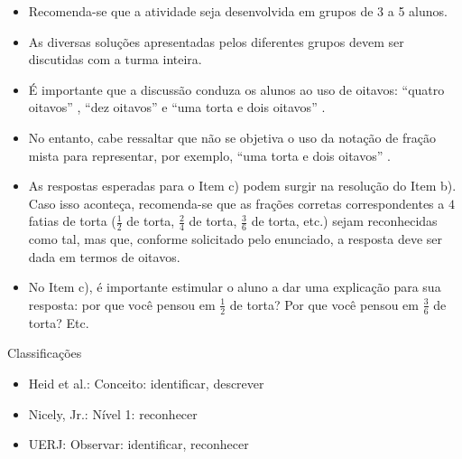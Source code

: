 \documentclass[oneside]{book}
\begin{document}
\begin{multicols}{2}
\begin{itemize} %
    \item       Recomenda-se que a atividade seja desenvolvida em grupos de 3 a 5 alunos.
    \item       As diversas soluções apresentadas pelos diferentes grupos devem ser discutidas com a turma inteira.
    \item       É importante que a discussão conduza os alunos ao uso de oitavos:       ``quatro oitavos''      ,       ``dez oitavos''       e       ``uma torta e dois oitavos''      .
    \item       No entanto, cabe ressaltar que não se objetiva o uso da notação de fração mista para representar, por exemplo,       ``uma torta e dois oitavos''      .
    \item       As respostas esperadas para o Item c) podem surgir na resolução do Item b). Caso isso aconteça, recomenda-se que as frações corretas correspondentes a       $4$       fatias de torta ($\frac{1}{2}$       de torta,       $\frac{2}{4}$       de torta,       $\frac{3}{6}$       de torta, etc.) sejam reconhecidas como tal, mas que, conforme solicitado pelo enunciado, a resposta deve ser dada em termos de oitavos.
    \item       No Item c), é importante estimular o aluno a dar uma explicação para sua resposta: por que você pensou em       $\frac{1}{2}$       de torta? Por que você pensou em       $\frac{3}{6}$       de torta? Etc.
\end{itemize} %


  Classificações
\begin{itemize} %
    \item       Heid et al.: Conceito: identificar, descrever
    \item       Nicely, Jr.: Nível 1: reconhecer
    \item       UERJ: Observar: identificar, reconhecer
\end{itemize} %





\end{multicols}
\end{document}
